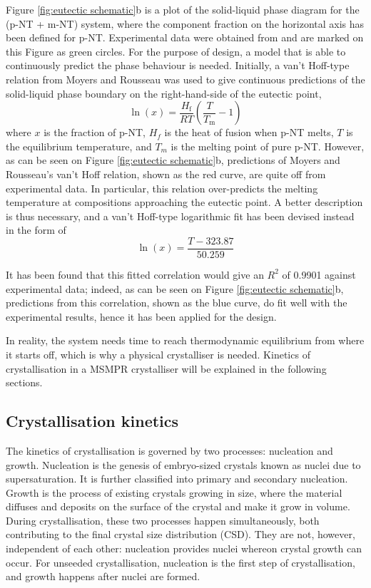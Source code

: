 Figure \ref{fig:eutectic schematic}b is a plot of the solid-liquid phase diagram for the (p-NT + m-NT) system, where the component fraction on the horizontal axis has been defined for p-NT. Experimental data were obtained from \cite{noauthor_detherm_2021} and are marked on this Figure as green circles. For the purpose of design, a model that is able to continuously predict the phase behaviour is needed. Initially, a van't Hoff-type relation from Moyers and Rousseau was used to give continuous predictions of the solid-liquid phase boundary on the right-hand-side of the eutectic point, \cite{moyers_crystallization_1987}
\begin{equation}\label{eq:vantHoff}
    \ln(x) = \frac{H_{\mathrm{f}}}{R T}\left(\frac{T}{T_{\mathrm{m}}} - 1\right)
\end{equation}
where $x$ is the fraction of p-NT, $H_f$ is the heat of fusion when p-NT melts, $T$ is the equilibrium temperature, and $T_{m}$ is the melting point of pure p-NT. However, as can be seen on Figure \ref{fig:eutectic schematic}b, predictions of Moyers and Rousseau's van't Hoff relation, shown as the red curve, are quite off from experimental data. In particular, this relation over-predicts the melting temperature at compositions approaching the eutectic point. A better description is thus necessary, and a van't Hoff-type logarithmic fit has been devised instead in the form of 
\begin{equation} \label{eq:fittedvantHoffcorrelation}
    \ln(x) = \frac{T - 323.87}{50.259}
\end{equation}

\noindent It has been found that this fitted correlation would give an $R^2$ of 0.9901 against experimental data; indeed, as can be seen on Figure \ref{fig:eutectic schematic}b, predictions from this correlation, shown as the blue curve, do fit well with the experimental results, hence it has been applied for the design.

In reality, the system needs time to reach thermodynamic equilibrium from where it starts off, which is why a physical crystalliser is needed. Kinetics of crystallisation in a MSMPR crystalliser will be explained in the following sections.

\subsection{Crystallisation kinetics}
The kinetics of crystallisation is governed by two processes: nucleation and growth. Nucleation is the genesis of embryo-sized crystals known as nuclei due to supersaturation. \cite{richardson_chemical_2006} It is further classified into primary and secondary nucleation. Growth is the process of existing crystals growing in size, where the material diffuses and deposits on the surface of the crystal and make it grow in volume. During crystallisation, these two processes happen simultaneously, both contributing to the final crystal size distribution (CSD). \cite{richardson_chemical_2006} They are not, however, independent of each other: nucleation provides nuclei whereon crystal growth can occur. For unseeded crystallisation, nucleation is the first step of crystallisation, and growth happens after nuclei are formed. \cite{mullin_crystallization_2001}

